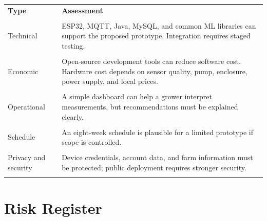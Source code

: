 \documentclass[12pt,a4paper]{report}
\begin{document}
\begin{longtable}{p{}p{}}

\toprule

\textbf{Type} & \textbf{Assessment}\\\\

\midrule

Technical & ESP32, MQTT, Java, MySQL, and common ML libraries can support the proposed prototype. Integration requires staged testing.\\\\

Economic & Open-source development tools can reduce software cost. Hardware cost depends on sensor quality, pump, enclosure, power supply, and local prices.\\\\

Operational & A simple dashboard can help a grower interpret measurements, but recommendations must be explained clearly.\\\\

Schedule & An eight-week schedule is plausible for a limited prototype if scope is controlled.\\\\

Privacy and security & Device credentials, account data, and farm information must be protected; public deployment requires stronger security.\\\\

\bottomrule

\end{longtable}

\section{Risk Register}
\end{document}

